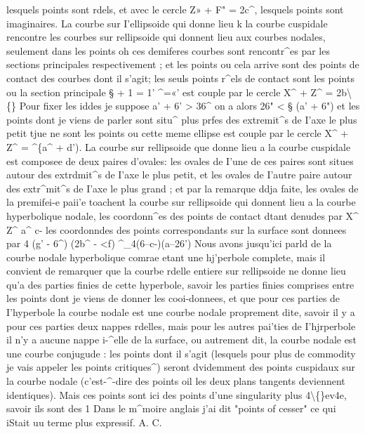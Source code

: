 \documentclass[11pt,a4paper]{book}
\begin{document}
lesquels  points  sont  rdels,  et  avec  le  cercle
Z»  +  F"  =  2c^,
lesquels  points  sont  imaginaires.  La  courbe  sur  I'ellipsoide  qui  donne  lieu  k  la  courbe
cuspidale  rencontre  les  courbes  sur  rellipsoide  qui  donnent  lieu  aux  courbes  nodales,
seulement  dans  les  points  oh  ces  demiferes  courbes  sont  rencontr^es  par  les  sections
principales  respectivement ;  et  les  points  ou  cela  arrive  sont  des  points  de  contact  des
courbes  dont  il  s'agit;  les  seuls  points  r^els  de  contact  sont  les  points  ou  la  section
principale
§  +  1
=  1'  ^=«'
est  couple  par  le  cercle  X^  +  Z^  =  2b\textbackslash\{\}  Pour  fixer  les  iddes  je  suppose  a'  +  6'  >  36^  on  a
alors  26"  <  §  (a'  +  6")  et  les  points  dont  je  viens  de  parler  sont  situ^  plus  prfes  des
extremit^s  de  I'axe  le  plus  petit  tjue  ne  sont  les  points  ou  cette  meme  ellipse  est
couple   par   le   cercle
X^  +  Z^  =  ^\{a^  +  d').
La  courbe  sur  rellipsoide  que  donne  lieu  a  la  courbe  cuspidale  est  composee  de  deux
paires  d'ovales:  les  ovales  de  I'une  de  ces  paires  sont  situes  autour  des  extrdmit^s
de  I'axe  le  plus  petit,  et  les  ovales  de  I'autre  paire  autour  des  extr^mit^s  de  I'axe
le  plus  grand ;  et  par  la  remarque  ddja  faite,  les  ovales  de  la  premifei-e  paii'e  toachent  la
courbe  sur  rellipsoide  qui  donnent  lieu  a  la  courbe  hyperbolique  nodale,  les  coordonn^es
des  points  de  contact  dtant  denudes  par
X^     Z^
a^       c-
les  coordonndes  des  points  correspondants  sur  la  surface  sont  donnees  par
4 (g' -  6^) (2b^ - <f)  ^_4(6--c-)(a--26')
Nous  avons  jusqu'ici  parld  de  la  courbe  nodale  hyperbolique  comrae  etant  une
hj'perbole  complete,  mais  il  convient  de  remarquer  que  la  courbe  rdelle  entiere  sur
rellipsoide  ne  donne  lieu  qu'a  des  parties  finies  de  cette  hyperbole,  savoir  les  parties
finies  comprises  entre  les  points  dont  je  viens  de  donner  les  cooi-donnees,  et  que  pour  ces
parties  de  I'hyperbole  la  courbe  nodale  est  une  courbe  nodale  proprement  dite,  savoir
il  y  a  pour  ces  parties  deux  nappes  rdelles,  mais  pour  les  autres  pai'ties  de  I'hjrperbole
il  n'y  a  aucune  nappe  i-^elle  de  la  surface,  ou  autrement  dit,  la  courbe  nodale  est
une  courbe  conjugude :  les  points  dont  il  s'agit  (lesquels  pour  plus  de  commodity  je
vais  appeler  les  points  critiques^)  seront  dvidemment  des  points  cuspidaux  sur  la  courbe
nodale  (c'est-^-dire  des  points  oil  les  deux  plans  tangents  deviennent  identiques).
Mais   ces    points   sont   ici   des   points    d'une   singularity   plus   4\textbackslash\{\}ev4e,   savoir   ils   sont   des
1  Dans  le  m^moire  anglais  j'ai  dit  "points  of  cesser"  ce  qui  iStait  uu  terme  plus  expressif.    A.  C.
\clearpage
\end{document}

